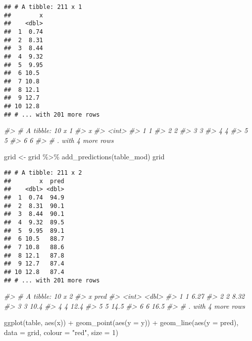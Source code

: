 \documentclass[
]{article}
\newenvironment{Shaded}{\begin{snugshade}}{\end{snugshade}}
\newcommand{\AttributeTok}[1]{\textcolor[rgb]{0.77,0.63,0.00}{#1}}
\newcommand{\CommentTok}[1]{\textcolor[rgb]{0.56,0.35,0.01}{\textit{#1}}}
\newcommand{\DecValTok}[1]{\textcolor[rgb]{0.00,0.00,0.81}{#1}}
\newcommand{\FunctionTok}[1]{\textcolor[rgb]{0.00,0.00,0.00}{#1}}
\newcommand{\NormalTok}[1]{#1}
\newcommand{\OtherTok}[1]{\textcolor[rgb]{0.56,0.35,0.01}{#1}}
\newcommand{\SpecialCharTok}[1]{\textcolor[rgb]{0.00,0.00,0.00}{#1}}
\newcommand{\StringTok}[1]{\textcolor[rgb]{0.31,0.60,0.02}{#1}}
\begin{document}
\begin{verbatim}
## # A tibble: 211 x 1
##        x
##    <dbl>
##  1  0.74
##  2  8.31
##  3  8.44
##  4  9.32
##  5  9.95
##  6 10.5 
##  7 10.8 
##  8 12.1 
##  9 12.7 
## 10 12.8 
## # ... with 201 more rows
\end{verbatim}

\begin{Shaded}
\begin{Highlighting}[]
\CommentTok{\#\textgreater{} \# A tibble: 10 x 1}
\CommentTok{\#\textgreater{}       x}
\CommentTok{\#\textgreater{}   \textless{}int\textgreater{}}
\CommentTok{\#\textgreater{} 1     1}
\CommentTok{\#\textgreater{} 2     2}
\CommentTok{\#\textgreater{} 3     3}
\CommentTok{\#\textgreater{} 4     4}
\CommentTok{\#\textgreater{} 5     5}
\CommentTok{\#\textgreater{} 6     6}
\CommentTok{\#\textgreater{} \# . with 4 more rows}

\NormalTok{grid }\OtherTok{\textless{}{-}}\NormalTok{ grid }\SpecialCharTok{\%\textgreater{}\%} 
  \FunctionTok{add\_predictions}\NormalTok{(table\_mod) }
\NormalTok{grid}
\end{Highlighting}
\end{Shaded}

\begin{verbatim}
## # A tibble: 211 x 2
##        x  pred
##    <dbl> <dbl>
##  1  0.74  94.9
##  2  8.31  90.1
##  3  8.44  90.1
##  4  9.32  89.5
##  5  9.95  89.1
##  6 10.5   88.7
##  7 10.8   88.6
##  8 12.1   87.8
##  9 12.7   87.4
## 10 12.8   87.4
## # ... with 201 more rows
\end{verbatim}

\begin{Shaded}
\begin{Highlighting}[]
\CommentTok{\#\textgreater{} \# A tibble: 10 x 2}
\CommentTok{\#\textgreater{}       x  pred}
\CommentTok{\#\textgreater{}   \textless{}int\textgreater{} \textless{}dbl\textgreater{}}
\CommentTok{\#\textgreater{} 1     1  6.27}
\CommentTok{\#\textgreater{} 2     2  8.32}
\CommentTok{\#\textgreater{} 3     3 10.4 }
\CommentTok{\#\textgreater{} 4     4 12.4 }
\CommentTok{\#\textgreater{} 5     5 14.5 }
\CommentTok{\#\textgreater{} 6     6 16.5 }
\CommentTok{\#\textgreater{} \# . with 4 more rows}

\FunctionTok{ggplot}\NormalTok{(table, }\FunctionTok{aes}\NormalTok{(x)) }\SpecialCharTok{+}
  \FunctionTok{geom\_point}\NormalTok{(}\FunctionTok{aes}\NormalTok{(}\AttributeTok{y =}\NormalTok{ y)) }\SpecialCharTok{+}
  \FunctionTok{geom\_line}\NormalTok{(}\FunctionTok{aes}\NormalTok{(}\AttributeTok{y =}\NormalTok{ pred), }\AttributeTok{data =}\NormalTok{ grid, }\AttributeTok{colour =} \StringTok{"red"}\NormalTok{, }\AttributeTok{size =} \DecValTok{1}\NormalTok{)}
\end{Highlighting}
\end{Shaded}
\end{document}

